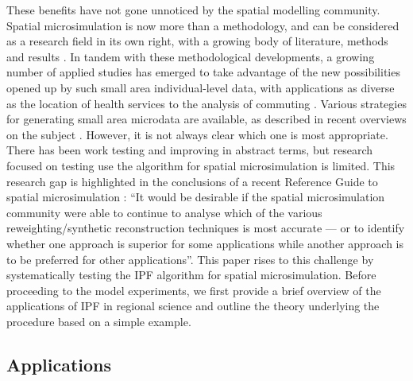 \documentclass[a4paper,10pt]{article}
\begin{document}
These benefits have not gone unnoticed by the spatial modelling community.
Spatial microsimulation is now more than a methodology, and
can be considered as a research field in its
own right, with a growing body of literature, methods and results \citep{Tanton2013}.
In tandem with these methodological developments, a growing number of applied studies
has emerged to take advantage of the new possibilities opened up by such small area individual-level data,
with applications as diverse as the location of health services \citep{Tomintz2008} to the
analysis of commuting \citep{Lovelace2014-jtg}.
Various strategies for generating small area microdata are available,
as described in recent overviews on the subject \citep{Tanton2013, Ballas2013-4policy-analysis, Hermes2012a}.
However, it is not always clear which one is most appropriate.
There has been work testing
 and improving \citep{teh2003improving} 
in abstract terms, but research focused on testing use the algorithm for spatial microsimulation is limited.
This research gap is highlighted in the conclusions of a recent Reference Guide to spatial microsimulation
\citep[p~270]{Clarke2013-concs}:
``It would be desirable if the spatial microsimulation community were able to continue to
analyse which of the various reweighting/synthetic reconstruction techniques is most accurate
--- or to identify whether one approach is superior for some applications while another
approach is to be preferred for other applications''.
This paper rises to this challenge by systematically testing the IPF algorithm for spatial microsimulation.
Before proceeding to the model experiments, we first
provide a brief overview of the applications of IPF in regional science
and outline the theory underlying the procedure based on a simple example. 

\subsection{Applications}
\end{document}
